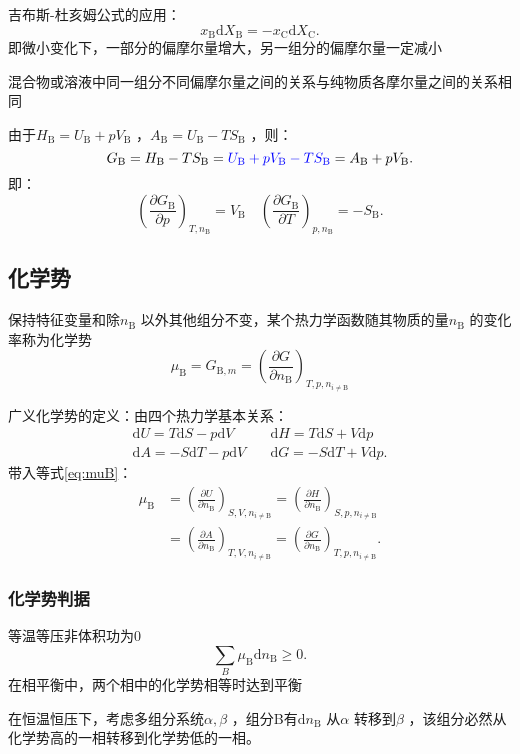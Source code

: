 \begin{notation}
    吉布斯-杜亥姆公式的应用：
    \[
        x_\text{B}\mathrm{d}X_\text{B} = -x_\text{C}\mathrm{d}X_\text{C}
    .\]
    即微小变化下，一部分的偏摩尔量增大，另一组分的偏摩尔量一定减小
\end{notation}
混合物或溶液中同一组分不同偏摩尔量之间的关系与纯物质各摩尔量之间的关系相同
\begin{eg}
    由于$H_\text{B} = U_\text{B}+pV_\text{B}$ ，$A_\text{B} = U_\text{B}-TS_\text{B}$ ，则：
    \[
        G_\text{B} = H_\text{B}-TS_\text{B}=\textcolor{blue}{U_\text{B}+pV_\text{B}-TS_\text{B}} = A_\text{B}+pV_\text{B}
    .\]
    即：\[
        \left(\frac{\partial G_\text{B}}{\partial p}\right)_{T,n_\text{B}} = V_\text{B}\quad \left(\frac{\partial G_\text{B}}{\partial T}\right)_{p,n_\text{B}} = -S_\text{B}
    .\]
\end{eg}
\subsection{化学势}%
\label{sub:化学势}
\begin{defi}
    保持特征变量和除$n_\text{B}$ 以外其他组分不变，某个热力学函数随其物质的量$n_\text{B}$ 的变化率称为化学势
    \begin{equation}
        \label{eq:muB}
        \mu_\text{B} = G_{\text{B},m} = \left(\frac{\partial G}{\partial n_\text{B}}\right)_{T,p,n_{i\neq \text{B}}}
    \end{equation}
\end{defi}
广义化学势的定义：由四个热力学基本关系：
\begin{align*}
    \mathrm{d}U = T\mathrm{d}S -p\mathrm{d}V &\quad \mathrm{d}H = T\mathrm{d}S + V\mathrm{d}p \\
    \mathrm{d}A = -S\mathrm{d}T -p\mathrm{d}V &\quad \mathrm{d}G = -S\mathrm{d}T+V\mathrm{d}p
.\end{align*}
带入等式\ref{eq:muB}：
\begin{align*}
    \mu_\text{B} &= \left(\frac{\partial U}{\partial n_\text{B}}\right)_{S,V,n_{i\neq \text{B}}} = \left(\frac{\partial H}{\partial n_\text{B}}\right)_{S,p,n_{i\neq \text{B}}} \\
    &= \left(\frac{\partial A}{\partial n_\text{B}}\right)_{T,V,n_{i\neq \text{B}}} = \left(\frac{\partial G}{\partial n_\text{B}}\right)_{T,p,n_{i\neq \text{B}}}
.\end{align*}
\subsubsection*{化学势判据}%
\label{subsub*:化学势判据}
等温等压非体积功为0
\[
    \sum_{B}\mu_\text{B}\mathrm{d}n_\text{B}\ge 0
.\]
在相平衡中，两个相中的化学势相等时达到平衡
\begin{notation}
    在恒温恒压下，考虑多组分系统$\alpha,\beta$ ，组分B有$\mathrm{d}n_\text{B}$ 从$\alpha$ 转移到$\beta$ ，该组分必然从化学势高的一相转移到化学势低的一相。
\end{notation}
